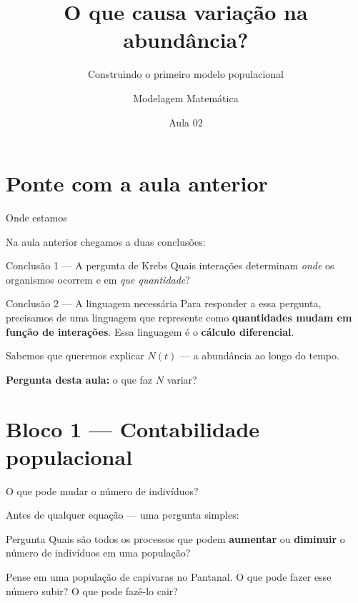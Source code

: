 \documentclass[12pt]{beamer}
\title{O que causa variação na abundância?}
\subtitle{Construindo o primeiro modelo populacional}
\author{Modelagem Matemática}
\institute{Matemática Aplicada}
\date{Aula 02}
\begin{document}
\begin{frame}
  \titlepage
\end{frame}

\section{Ponte com a aula anterior}

\begin{frame}{Onde estamos}

  Na aula anterior chegamos a duas conclusões:

  \bigskip
  \begin{block}{Conclusão 1 — A pergunta de Krebs}
    Quais interações determinam \emph{onde} os organismos
    ocorrem e em \emph{que quantidade}?
  \end{block}

  \begin{exampleblock}{Conclusão 2 — A linguagem necessária}
    Para responder a essa pergunta, precisamos de uma linguagem
    que represente como \textbf{quantidades mudam em função de interações}.
    Essa linguagem é o \textbf{cálculo diferencial}.
  \end{exampleblock}

  \bigskip
  Sabemos que queremos explicar $N(t)$ --- a abundância ao longo do tempo.

  \bigskip
  \textbf{Pergunta desta aula:} o que faz $N$ variar?

\end{frame}

\section{Bloco 1 — Contabilidade populacional}

\begin{frame}{O que pode mudar o número de indivíduos?}

  Antes de qualquer equação --- uma pergunta simples:

  \bigskip
  \begin{alertblock}{Pergunta}
    Quais são todos os processos que podem \textbf{aumentar}
    ou \textbf{diminuir} o número de indivíduos em uma população?
  \end{alertblock}

  \bigskip
  Pense em uma população de capivaras no Pantanal.
  O que pode fazer esse número subir? O que pode fazê-lo cair?

\end{frame}
\end{document}

